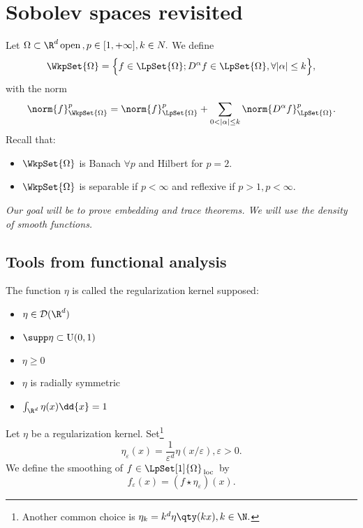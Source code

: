 
\section{Sobolev spaces revisited}
\label{sec:sobolev_revisited}
Let $\Omega \subset \R^d \, \text{open} \,, p \in [1,+\infty], k \in N.$ We define
\[
	\WkpSet{\Omega} = \Big\{f \in \LpSet{\Omega}; D^\alpha f \in \LpSet{\Omega}, \forall |\alpha| \leq k \Big\},
\]
with the norm
\[
	\norm{f}_{\WkpSet{\Omega}}^p = \norm{f}_{\LpSet{\Omega}}^p + \sum_{0< |\alpha| \leq k} \norm{D^\alpha f}_{\LpSet{\Omega}}^p.
\]
Recall that:
\begin{itemize}
	\item	$\WkpSet{\Omega}$ is Banach $\forall p$ and Hilbert for $p=2$. 
	\item $\WkpSet{\Omega}$ is separable if $p < \infty$ and reflexive if $p>1, p<\infty$.
\end{itemize}


\textit{Our goal will be to prove embedding and trace theorems. We will use the density of smooth functions.}

\subsection{Tools from functional analysis}
\label{sec:fa_tools}

\begin{definition}
	The function $\eta$ is called the regularization kernel supposed:
	\begin{itemize}
		\item $\eta \in \mathcal{D}(\R^d)$
		\item $\supp \eta \subset \text{U}(0,1)$
		\item $\eta \geq 0$
		\item $\eta$ is radially symmetric
		\item $\int_{\R^d}\eta(x)\dd{x} = 1$
	\end{itemize}
\end{definition}

\begin{definition}
	Let $\eta$ be a regularization kernel. Set\footnote{Another common choice is $\eta_k = k^d \eta\qty(kx), k \in \N.$}
	\[
		\eta_{\varepsilon}(x) = \frac{1}{\varepsilon^{d}} \eta (x/\varepsilon), \varepsilon >0.
	\]
	We define the smoothing of $f \in \LpSet[1]{\Omega}_{\, \text{loc} \,}$ by
	\[
		f_{\varepsilon}(x) = (f \star \eta_{\varepsilon})(x).
	\]
\end{definition}

